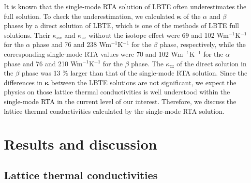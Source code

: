 \documentclass[twocolumn,amsmath,amssymb,a4paper,prb,superscriptaddress,floatfix]{revtex4-1}
\begin{document}
It is known that the single-mode RTA solution of LBTE often underestimates the
full solution.\cite{mukhopadhyay-ltc,ward-ltc} To check the underestimation, we
calculated $\boldsymbol{\kappa}$ of the $\alpha$ and $\beta$ phases by a direct
solution of LBTE\cite{chaput-direct}, which is one of the methods of LBTE full
solutions. Their $\kappa_{xx}$ and $\kappa_{zz}$ without the isotope effect were
69 and 102 Wm$^{-1}$K$^{-1}$ for  the $\alpha$ phase and 76 and 238
Wm$^{-1}$K$^{-1}$ for the $\beta$ phase, respectively, while the corresponding
single-mode RTA values were 70 and 102 Wm$^{-1}$K$^{-1}$ for the $\alpha$ phase
and 76 and 210 Wm$^{-1}$K$^{-1}$ for the $\beta$ phase. The $\kappa_{zz}$ of the
direct solution in the $\beta$ phase was 13 \% larger than that of the
single-mode RTA solution. Since the differences in $\boldsymbol{\kappa}$ between
the LBTE solutions are not significant, we expect the physics on those lattice
thermal conductivities is well understood within the single-mode RTA in the
current level of our interest. Therefore, we discuss the lattice thermal
conductivities calculated by the single-mode RTA solution.

\section{Results and discussion}

\subsection{Lattice thermal conductivities}
\end{document}
